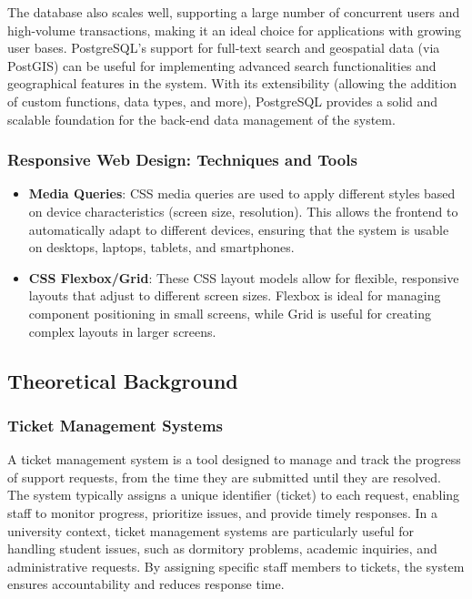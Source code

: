 	The database also scales well, supporting a large number of concurrent users and high-volume transactions, making it an ideal choice for applications with growing user bases. PostgreSQL’s support for full-text search and geospatial data (via PostGIS) can be useful for implementing advanced search functionalities and geographical features in the system. With its extensibility (allowing the addition of custom functions, data types, and more), PostgreSQL provides a solid and scalable foundation for the back-end data management of the system. \\
	
	\subsubsection{Responsive Web Design: Techniques and Tools}
	
	\begin{itemize}
		\item \textbf{Media Queries}: CSS media queries are used to apply different styles based on device characteristics (screen size, resolution). This allows the frontend to automatically adapt to different devices, ensuring that the system is usable on desktops, laptops, tablets, and smartphones.
		
		\item \textbf{CSS Flexbox/Grid}: These CSS layout models allow for flexible, responsive layouts that adjust to different screen sizes. Flexbox is ideal for managing component positioning in small screens, while Grid is useful for creating complex layouts in larger screens.
	\end{itemize}


\subsection{Theoretical Background}

	\subsubsection{Ticket Management Systems}
	A ticket management system is a tool designed to manage and track the progress of support requests, from the time they are submitted until they are resolved. The system typically assigns a unique identifier (ticket) to each request, enabling staff to monitor progress, prioritize issues, and provide timely responses.
	In a university context, ticket management systems are particularly useful for handling student issues, such as dormitory problems, academic inquiries, and administrative requests. By assigning specific staff members to tickets, the system ensures accountability and reduces response time.
	
